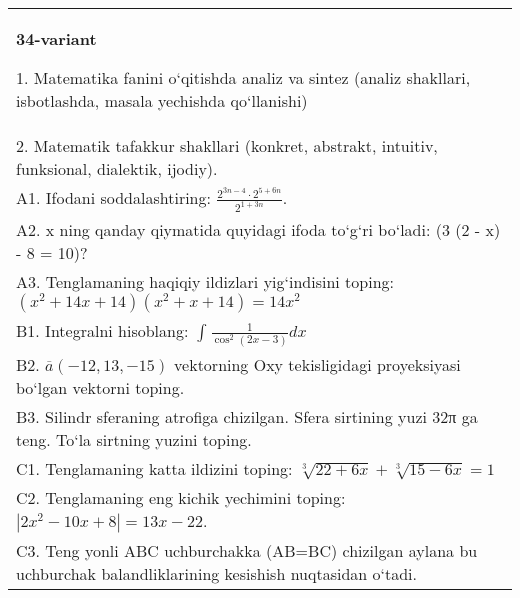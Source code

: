 \documentclass{article}
\begin{document}
\begin{tabular}{m{17cm}}
\textbf{34-variant}

1. Matematika fanini o‘qitishda analiz va sintez (analiz shakllari, isbotlashda, masala yechishda qo‘llanishi) \\
2. Matematik tafakkur shakllari (konkret, abstrakt, intuitiv, funksional, dialektik, ijodiy). \\
A1. Ifodani soddalashtiring: \(\frac{2^{3n - 4} \cdot 2^{5 + 6n}}{2^{1 + 3n}}\). \\
A2. x ning qanday qiymatida quyidagi ifoda to‘g‘ri bo‘ladi: (3 (2 - x) - 8 = 10)? \\
A3. Tenglamaning haqiqiy ildizlari yig‘indisini toping: \((x^2 + 14x + 14) (x^2 + x + 14) = 14x^2\) \\
B1. Integralni hisoblang: \(\int_{}^{}{\frac{1}{\cos^{2} (2x - 3) }dx}\) \\
B2. \(\overline{a} (- 12,13, - 15) \) vektorning Oxy tekisligidagi proyeksiyasi bo‘lgan vektorni toping. \\
B3. Silindr sferaning atrofiga chizilgan. Sfera sirtining yuzi 32π ga teng. To‘la sirtning yuzini toping. \\
C1. Tenglamaning katta ildizini toping: \(\sqrt[3]{22 + 6x} + \sqrt[3]{15 - 6x} = 1\) \\
C2. Tenglamaning eng kichik yechimini toping: \(\left| 2x^2 - 10x + 8 \right| = 13x - 22\). \\
C3. Teng yonli ABC uchburchakka (AB=BC) chizilgan aylana bu uchburchak balandliklarining kesishish nuqtasidan o‘tadi. \\

\end{tabular}
\vspace{1cm}
\end{document}
